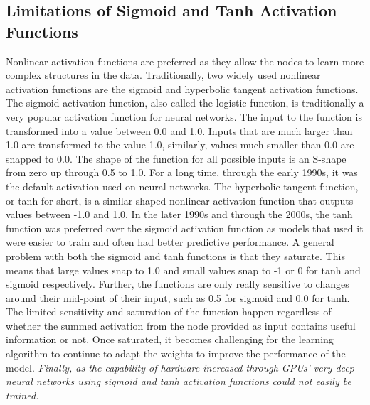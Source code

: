 \documentclass[11pt]{article}
\begin{document}
\subsection{Limitations of Sigmoid and Tanh Activation Functions}
\hspace*{1cm} Nonlinear activation functions are preferred as they allow the nodes to learn more complex structures in the data. Traditionally, two widely used nonlinear activation functions are the sigmoid and hyperbolic tangent activation functions. The sigmoid activation function, also called the logistic function, is traditionally a very popular activation function for neural networks. The input to the function is transformed into a value between 0.0 and 1.0. Inputs that are much larger than 1.0 are transformed to the value 1.0, similarly, values much smaller than 0.0 are snapped to 0.0. The shape of the function for all possible inputs is an S-shape from zero up through 0.5 to 1.0. For a long time, through the early 1990s, it was the default activation used on neural networks. The hyperbolic tangent function, or tanh for short, is a similar shaped nonlinear activation function that outputs values between -1.0 and 1.0. In the later 1990s and through the 2000s, the tanh function was preferred over the sigmoid activation function as models that used it were easier to train and often had better predictive performance. A general problem with both the sigmoid and tanh functions is that they saturate. This means that large values snap to 1.0 and small values snap to -1 or 0 for tanh and sigmoid respectively. Further, the functions are only really sensitive to changes around their mid-point of their input, such as 0.5 for sigmoid and 0.0 for tanh. The limited sensitivity and saturation of the function happen regardless of whether the summed activation from the node provided as input contains useful information or not. Once saturated, it becomes challenging for the learning algorithm to continue to adapt the weights to improve the performance of the model. \textit{Finally, as the capability of hardware increased through GPUs’ very deep neural networks using sigmoid and tanh activation functions could not easily be trained.}
\end{document}
